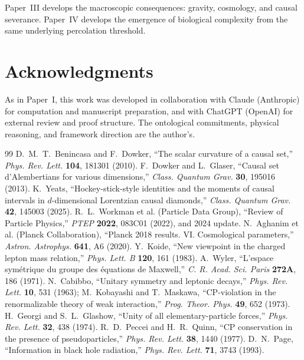 \documentclass[11pt]{article}
\begin{document}
Paper~III develops the macroscopic consequences: gravity, cosmology, and causal severance. Paper~IV develops the emergence of biological complexity from the same underlying percolation threshold.

\section*{Acknowledgments}

As in Paper~I, this work was developed in collaboration with Claude (Anthropic) for computation and manuscript preparation, and with ChatGPT (OpenAI) for external review and proof structure. The ontological commitments, physical reasoning, and framework direction are the author's.

\begin{thebibliography}{99}
 D.~M.~T.~Benincasa and F.~Dowker, ``The scalar curvature of a causal set,'' \emph{Phys. Rev. Lett.} \textbf{104}, 181301 (2010).
 F.~Dowker and L.~Glaser, ``Causal set d'Alembertians for various dimensions,'' \emph{Class. Quantum Grav.} \textbf{30}, 195016 (2013).
 K.~Yeats, ``Hockey-stick-style identities and the moments of causal intervals in $d$-dimensional Lorentzian causal diamonds,'' \emph{Class. Quantum Grav.} \textbf{42}, 145003 (2025).
 R.~L.~Workman et al. (Particle Data Group), ``Review of Particle Physics,'' \emph{PTEP} \textbf{2022}, 083C01 (2022), and 2024 update.
 N.~Aghanim et al. (Planck Collaboration), ``Planck 2018 results. VI. Cosmological parameters,'' \emph{Astron. Astrophys.} \textbf{641}, A6 (2020).
 Y.~Koide, ``New viewpoint in the charged lepton mass relation,'' \emph{Phys. Lett. B} \textbf{120}, 161 (1983).
 A.~Wyler, ``L'espace sym\'etrique du groupe des \'equations de Maxwell,'' \emph{C. R. Acad. Sci. Paris} \textbf{272A}, 186 (1971).
 N.~Cabibbo, ``Unitary symmetry and leptonic decays,'' \emph{Phys. Rev. Lett.} \textbf{10}, 531 (1963); M.~Kobayashi and T.~Maskawa, ``CP-violation in the renormalizable theory of weak interaction,'' \emph{Prog. Theor. Phys.} \textbf{49}, 652 (1973).
 H.~Georgi and S.~L.~Glashow, ``Unity of all elementary-particle forces,'' \emph{Phys. Rev. Lett.} \textbf{32}, 438 (1974).
 R.~D.~Peccei and H.~R.~Quinn, ``CP conservation in the presence of pseudoparticles,'' \emph{Phys. Rev. Lett.} \textbf{38}, 1440 (1977).
 D.~N.~Page, ``Information in black hole radiation,'' \emph{Phys. Rev. Lett.} \textbf{71}, 3743 (1993).
\end{thebibliography}
\end{document}
